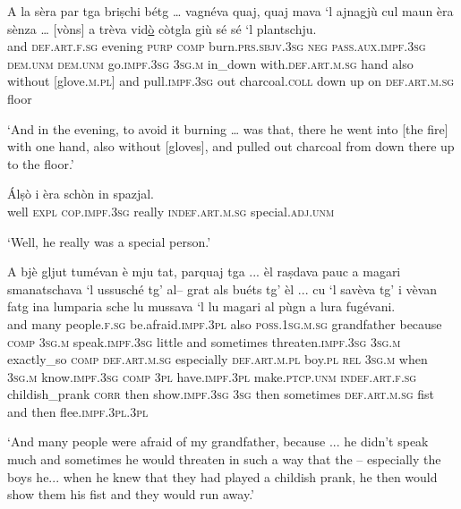 \begin{linenumbers}
\gll  A la sèra par tga briṣchi bétg … vagnéva quaj, quaj mava `l ajnagjù cul maun èra sènza … [vòns] a trèva vid\underline{ò} còtgla giù sé sé  `l plantschju.  \\
and \textsc{def.art.f.sg} evening \textsc{purp} \textsc{comp} burn.\textsc{prs.sbjv.3sg} \textsc{neg} {} \textsc{pass.aux.impf.3sg} \textsc{dem.unm} \textsc{dem.unm} go.\textsc{impf.3sg} \textsc{3sg.m} in\_down with.\textsc{def.art.m.sg} hand also without {} [glove.\textsc{m.pl}] and pull.\textsc{impf.3sg} out charcoal.\textsc{coll} down up on \textsc{def.art.m.sg} floor  \\
\end{linenumbers}
\medskip
\glt `And in the evening, to avoid it burning … was that, there he went into [the fire] with one hand, also without [gloves], and pulled out charcoal from down there up to the floor.'
\medskip

\begin{linenumbers}
\gll Álṣò i èra schòn in spazjal.    \\
well \textsc{expl} \textsc{cop.impf.3sg} really \textsc{indef.art.m.sg} special.\textsc{adj.unm} \\
\end{linenumbers}
\medskip
\glt `Well, he really was a special person.'
\medskip 

\begin{linenumbers}
\gll  A bjè gljut tumévan è mju tat, parquaj tga ... èl raṣdava pauc a magari smanatschava `l ussusché tg’ al– grat als buéts tg’ èl ... cu `l savèva tg’ i vèvan fatg ina lumparia sche lu mussava `l lu magari al pùgn a lura fugévani.  \\
and many people.\textsc{f.sg} be.afraid.\textsc{impf.3pl} also \textsc{poss.1sg.m.sg} grandfather because \textsc{comp} {} \textsc{3sg.m} speak.\textsc{impf.3sg} little and sometimes threaten.\textsc{impf.3sg} \textsc{3sg.m} exactly\_so \textsc{comp} \textsc{def.art.m.sg} especially \textsc{def.art.m.pl} boy.\textsc{pl} \textsc{rel} \textsc{3sg.m} {} when \textsc{3sg.m} know.\textsc{impf.3sg} \textsc{comp} \textsc{3pl} have.\textsc{impf.3pl} make.\textsc{ptcp.unm} \textsc{indef.art.f.sg} childish\_prank \textsc{corr} then show.\textsc{impf.3sg} \textsc{3sg} then sometimes \textsc{def.art.m.sg} fist and then flee.\textsc{impf.3pl.3pl} \\
\end{linenumbers}
\medskip
\glt `And many people were afraid of my grandfather, because ... he didn’t speak much and sometimes he would threaten in such a way that the – especially the boys he... when he knew that they had played a childish prank, he then would show them his fist and they would run away.'
\medskip

